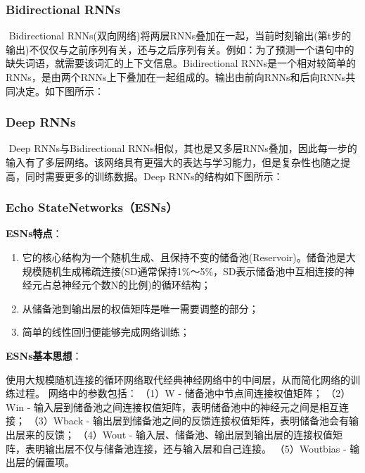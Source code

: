 \subsubsection{ Bidirectional RNNs}\label{bidirectional-rnns}

​ Bidirectional
RNNs(双向网络)将两层RNNs叠加在一起，当前时刻输出(第t步的输出)不仅仅与之前序列有关，还与之后序列有关。例如：为了预测一个语句中的缺失词语，就需要该词汇的上下文信息。Bidirectional
RNNs是一个相对较简单的RNNs，是由两个RNNs上下叠加在一起组成的。输出由前向RNNs和后向RNNs共同决定。如下图所示：


\subsubsection{ Deep RNNs}\label{deep-rnns}

​ Deep RNNs与Bidirectional
RNNs相似，其也是又多层RNNs叠加，因此每一步的输入有了多层网络。该网络具有更强大的表达与学习能力，但是复杂性也随之提高，同时需要更多的训练数据。Deep
RNNs的结构如下图所示： %

\subsubsection{ Echo StateNetworks（ESNs）}\label{echo-state-networksesns}

\textbf{ESNs特点}：

\begin{enumerate}
\def\labelenumi{\arabic{enumi}.}
\item
  它的核心结构为一个随机生成、且保持不变的储备池(Reservoir)。储备池是大规模随机生成稀疏连接(SD通常保持1\%～5\%，SD表示储备池中互相连接的神经元占总神经元个数N的比例)的循环结构；
\item
  从储备池到输出层的权值矩阵是唯一需要调整的部分；
\item
  简单的线性回归便能够完成网络训练；
\end{enumerate}

\textbf{ESNs基本思想}：

​
使用大规模随机连接的循环网络取代经典神经网络中的中间层，从而简化网络的训练过程。
网络中的参数包括： （1）W - 储备池中节点间连接权值矩阵； （2）Win -
输入层到储备池之间连接权值矩阵，表明储备池中的神经元之间是相互连接；
（3）Wback -
输出层到储备池之间的反馈连接权值矩阵，表明储备池会有输出层来的反馈；
（4）Wout -
输入层、储备池、输出层到输出层的连接权值矩阵，表明输出层不仅与储备池连接，还与输入层和自己连接。
（5）Woutbias - 输出层的偏置项。

